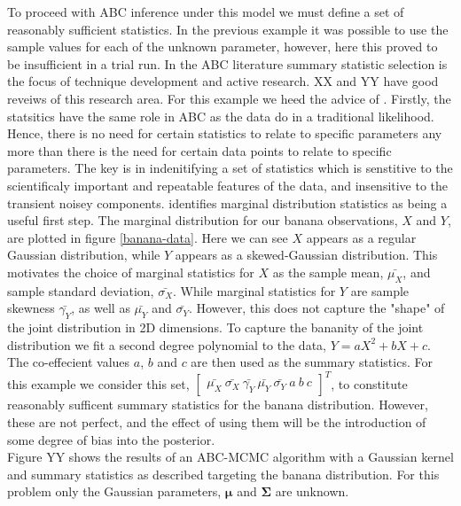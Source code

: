 To proceed with ABC inference under this model we must define a set of reasonably sufficient statistics. In the previous example it was possible to use the sample values for each of the unknown parameter, however, here this proved to be insufficient in a trial run. In the ABC literature summary statistic selection is the focus of technique development and active research. XX and YY have good reveiws of this research area. For this example we heed the advice of \citet{Wood2010}. Firstly, the statsitics have the same role in ABC as the data do in a traditional likelihood. Hence, there is no need for certain statistics to relate to specific parameters any more than there is the need for certain data points to relate to specific parameters. The key is in indenitifying a set of statistics which is senstitive to the scientificaly important and repeatable features of the data, and insensitive to the transient noisey components. \citet{Wood2010} identifies marginal distribution statistics as being a useful first step. The marginal distribution for our banana observations, $X$ and $Y$, are plotted in figure \ref{banana-data}. Here we can see $X$ appears as a regular Gaussian distribution, while $Y$ appears as a skewed-Gaussian distribution. This motivates the choice of marginal statistics for $X$ as the sample mean, $\bar{\mu_X}$, and sample standard deviation, $\bar{\sigma_X}$. While marginal statistics for $Y$ are sample skewness $\bar{\gamma_Y}$, as well as $\bar{\mu_Y}$ and $\bar{\sigma_Y}$. However, this does not capture the "shape" of the joint distribution in 2D dimensions. To capture the bananity of the joint distribution we fit a second degree polynomial to the data, $Y = aX^2 + bX + c$. The co-effecient values $a$, $b$ and $c$ are then used as the summary statistics. For this example we consider this set, $\begin{bmatrix}
\bar{\mu_X}\ \bar{\sigma_X}\ \bar{\gamma_Y}\ \bar{\mu_Y}\ \bar{\sigma_Y}\ a\ b\ c
\end{bmatrix}^T$, to constitute reasonably sufficent summary statistics for the banana distribution. However, these are not perfect, and the effect of using them will be the introduction of some degree of bias into the posterior. \\


Figure YY shows the results of an ABC-MCMC algorithm with a Gaussian kernel and summary statistics as described targeting the banana distribution. For this problem only the Gaussian parameters, $\bm{\mu}$ and $\bm{\Sigma}$ are unknown.\\

